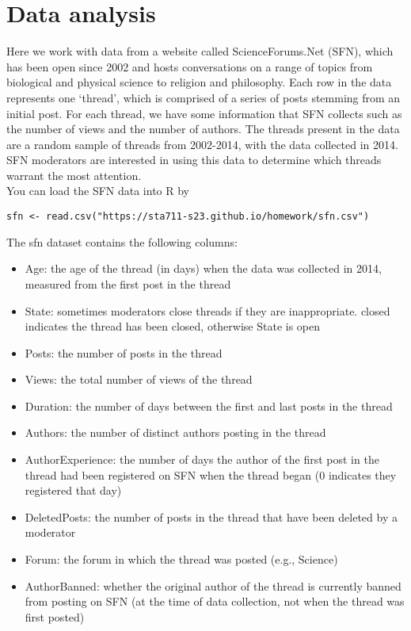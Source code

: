 \documentclass[11pt]{article}
\begin{document}
\section*{Data analysis}

Here we work with data from a website called ScienceForums.Net (SFN), which has been open since 2002 and hosts conversations on a range of topics from biological and physical science to religion and philosophy. Each row in the data represents one ‘thread’, which is comprised of a series of posts stemming from an initial post. For each thread, we have some information that SFN collects such as the number of views and the number of authors. The threads present in the data are a random sample of threads from 2002-2014, with the data collected in 2014. SFN moderators are interested in using this data to determine which threads warrant the most attention.\\

\noindent You can load the SFN data into R by

\begin{verbatim}
sfn <- read.csv("https://sta711-s23.github.io/homework/sfn.csv")
\end{verbatim}

\noindent The sfn dataset contains the following columns:

\begin{itemize}
\item Age: the age of the thread (in days) when the data was collected in 2014, measured from the first post in the thread
\item State: sometimes moderators close threads if they are inappropriate. closed indicates the thread has been closed, otherwise State is open
\item Posts: the number of posts in the thread
\item Views: the total number of views of the thread
\item Duration: the number of days between the first and last posts in the thread
\item Authors: the number of distinct authors posting in the thread
\item AuthorExperience: the number of days the author of the first post in the thread had been registered on SFN when the thread began (0 indicates they registered that day)
\item DeletedPosts: the number of posts in the thread that have been deleted by a moderator
\item Forum: the forum in which the thread was posted (e.g., Science)
\item AuthorBanned: whether the original author of the thread is currently banned from posting on SFN (at the time of data collection, not when the thread was first posted)
\end{itemize}
\end{document}
